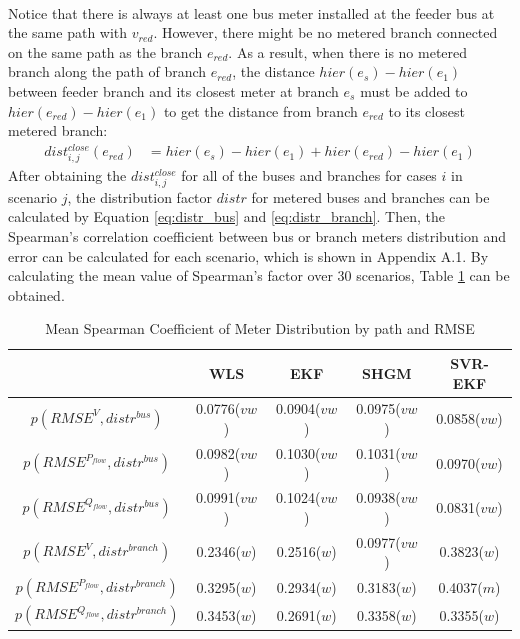\bigskip
\noindent
\\Notice that there is always at least one bus meter installed at the feeder bus at the same path with $v_{red}$. However, there might be no metered branch connected on the same path as the branch $e_{red}$. As a result, when there is no metered branch along the path of branch $e_{red}$, the distance $hier(e_s)-hier(e_1)$ between feeder branch and its closest meter at branch $e_s$ must be added to $hier(e_{red})-hier(e_1)$ to get the distance from branch $e_{red}$ to its closest metered branch:
\begin{align}
    dist_{i,j}^{close} (e_{red}) &= hier(e_s)-hier(e_1) + hier(e_{red}) - hier(e_1)
    \label{eq:branch_meter_path}
\end{align}
After obtaining the $dist_{i,j}^{close}$ for all of the buses and branches for cases $i$ in scenario $j$, the distribution factor $distr$ for metered buses and branches can be calculated by Equation \ref{eq:distr_bus} and \ref{eq:distr_branch}. Then, the Spearman's correlation coefficient between bus or branch meters distribution and error can be calculated for each scenario, which is shown in Appendix A.1. By calculating the mean value of Spearman's factor over 30 scenarios, Table \ref{tab:spearman_meter_distr_path} can be obtained.
    \begin{table}[!h]
        \centering
        \begin{tabular}{c|c|c|c|c}
             & WLS & EKF & SHGM & SVR-EKF\\ \hline
            $p(RMSE^V,distr^{bus})$ & 0.0776($vw$) & 0.0904($vw$) & 0.0975($vw$) &  0.0858($vw$)\\
            $p(RMSE^{P_{flow}},distr^{bus})$ & 0.0982($vw$) & 0.1030($vw$) & 0.1031($vw$) &  0.0970($vw$)\\
            $p(RMSE^{Q_{flow}},distr^{bus})$ & 0.0991($vw$) & 0.1024($vw$) & 0.0938($vw$) &  0.0831($vw$)\\
            $p(RMSE^V,distr^{branch})$ & 0.2346($w$) & 0.2516($w$) & 0.0977($vw$) &  0.3823($w$)\\
            $p(RMSE^{P_{flow}},distr^{branch})$ & 0.3295($w$) & 0.2934($w$) & 0.3183($w$) &  0.4037($m$)\\
            $p(RMSE^{Q_{flow}},distr^{branch})$ & 0.3453($w$) & 0.2691($w$) & 0.3358($w$) &  0.3355($w$)\\
        \end{tabular}
        \caption{Mean Spearman Coefficient of Meter Distribution by path and RMSE}
        \label{tab:spearman_meter_distr_path}
    \end{table}
